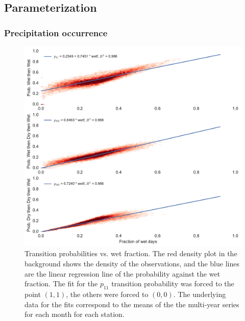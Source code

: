 \documentclass[
11pt, %
english, %
singlespacing, %
headsepline, %
]{MastersDoctoralThesis} %
\begin{document}
\begin{NoHyper}
\begin{refsection}
\subsection{Parameterization} \label{sec:param}

\subsubsection{Precipitation occurrence} \label{sec:markov}

\begin{figure}
	\includegraphics[width=\linewidth]{gwgen-figures/f03.pdf}
	\caption[Transition probabilities vs. wet fraction]{Transition probabilities vs. wet fraction. The red density plot in the background shows the density of the observations, and the blue lines are the linear regression line of the probability against the wet fraction. The fit for the $p_{11}$ transition probability was forced to the point $(1, 1)$, the others were forced to $(0, 0)$. The underlying data for the fits correspond to the means of the the multi-year series for each month for each station.}
	\label{fig:markov}
\end{figure}


\end{refsection}
\end{NoHyper}
\end{document}
